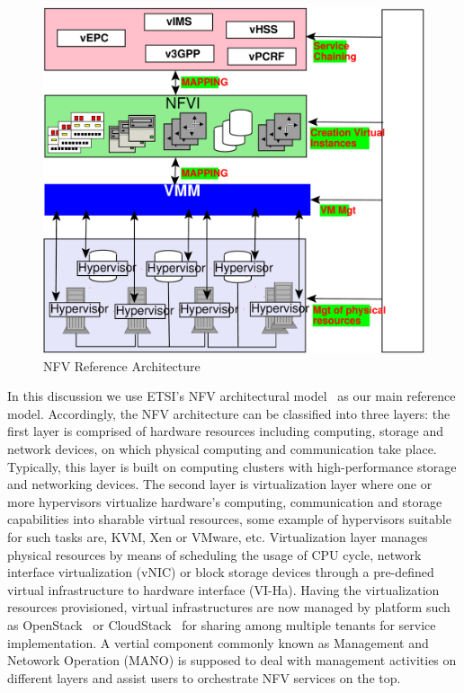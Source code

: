 \label{scenario}
\begin{figure}[ht]
	\centering
	\includegraphics[scale=0.23]{fig/architecture-single.pdf}
	\caption{NFV Reference Architecture}
	\label{fig:arch}
\end{figure} 

In this discussion we use ETSI's NFV architectural model~\cite{nfv} as our main
reference model. Accordingly, the NFV architecture can be classified into three
layers: the first layer is comprised of hardware resources including computing,
storage and network devices, on which physical computing and communication take
place. Typically, this layer is built on computing clusters with
high-performance storage and networking devices. The second layer is
virtualization layer where one or more hypervisors virtualize hardware's
computing, communication and storage capabilities into sharable virtual
resources, some example of hypervisors suitable for such tasks are, KVM, Xen or
VMware, etc. Virtualization layer manages physical resources by means of
scheduling the usage of CPU cycle, network interface virtualization (vNIC) or
block storage devices through a pre-defined virtual infrastructure to hardware
interface (VI-Ha). Having the virtualization resources provisioned, virtual
infrastructures are now managed by platform such as OpenStack~\cite{openstack}
or CloudStack~\cite{cloudstack} for sharing among multiple tenants for service
implementation. A vertial component commonly known as Management and Netowork
Operation (MANO) is supposed to deal with management activities on different
layers and assist users to orchestrate NFV services on the top. 

